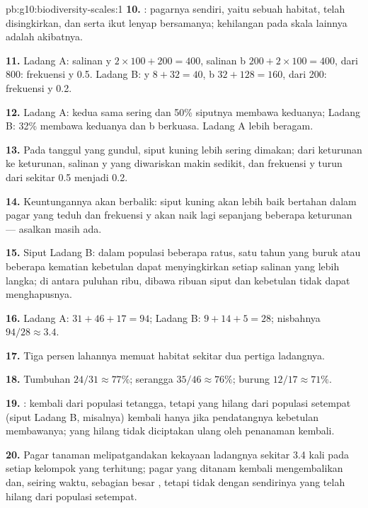 \begin{solution}{pb:g10:biodiversity-scales:1}
\textbf{10.} : pagarnya sendiri, yaitu sebuah habitat, telah
disingkirkan, dan  serta  ikut lenyap bersamanya;
kehilangan pada skala lainnya adalah akibatnya.

\textbf{11.} Ladang A: salinan y $2 \times 100 + 200 = 400$, salinan b
$200 + 2 \times 100 = 400$, dari 800: frekuensi y 0.5. Ladang B: y
$8 + 32 = 40$, b $32 + 128 = 160$, dari 200: frekuensi y 0.2.

\textbf{12.} Ladang A: kedua  sama sering dan 50\% siputnya
membawa keduanya; Ladang B: 32\% membawa keduanya dan b berkuasa.
Ladang A lebih beragam.

\textbf{13.} Pada tanggul yang gundul, siput kuning lebih sering
dimakan; dari keturunan ke keturunan, salinan y yang diwariskan makin
sedikit, dan frekuensi y turun dari sekitar 0.5 menjadi 0.2.

\textbf{14.} Keuntungannya akan berbalik: siput kuning akan lebih baik
bertahan dalam pagar yang teduh dan frekuensi y akan naik lagi
sepanjang beberapa keturunan --- asalkan  masih ada.

\textbf{15.} Siput Ladang B: dalam populasi beberapa ratus, satu tahun
yang buruk atau beberapa kematian kebetulan dapat menyingkirkan setiap
salinan  yang lebih langka; di antara puluhan ribu,  dibawa
ribuan siput dan kebetulan tidak dapat menghapusnya.

\textbf{16.} Ladang A: $31 + 46 + 17 = 94$; Ladang B: $9 + 14 + 5 = 28$;
nisbahnya $94/28 \approx 3.4$.

\textbf{17.} Tiga persen lahannya memuat habitat sekitar dua pertiga
 ladangnya.

\textbf{18.} Tumbuhan $24/31 \approx 77\%$; serangga $35/46 \approx 76\%$;
burung $12/17 \approx 71\%$.

\textbf{19.} :  kembali dari
populasi tetangga, tetapi  yang hilang dari populasi setempat
(siput Ladang B, misalnya) kembali hanya jika pendatangnya kebetulan
membawanya;  yang hilang tidak diciptakan ulang oleh penanaman kembali.

\textbf{20.} Pagar tanaman melipatgandakan kekayaan  ladangnya
sekitar 3.4 kali pada setiap kelompok yang terhitung; pagar yang
ditanam kembali mengembalikan  dan, seiring waktu,
sebagian besar , tetapi tidak dengan sendirinya  yang
telah hilang dari populasi setempat.
\end{solution}
